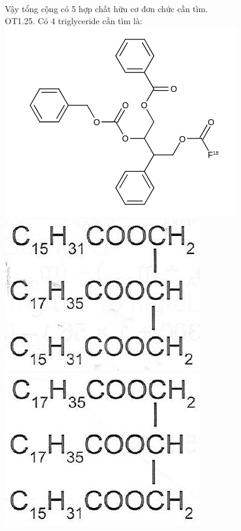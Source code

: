 \documentclass[10pt]{article}
\begin{document}
Vậy tổng cộng có 5 hợp chất hữu cơ đơn chức cần tìm.\\
OT1.25. Có 4 triglyceride cần tìm là:\\
\includegraphics{smile-0bcaf2b156ad310a3e87a37ff8e3da907718e690}\\
\includegraphics[max width=\textwidth, center]{2025_10_23_b4e16b74380d0f7e7700g-022(1)}\\
\includegraphics[max width=\textwidth, center]{2025_10_23_b4e16b74380d0f7e7700g-022}\\
\end{document}
